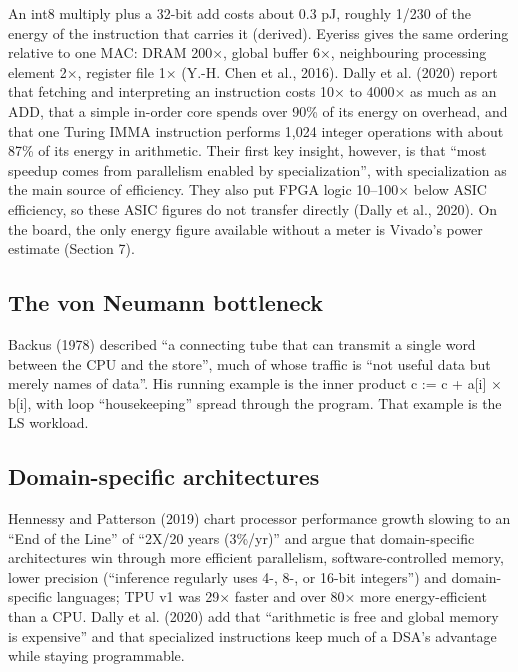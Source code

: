 An int8 multiply plus a 32-bit add costs about 0.3 pJ, roughly 1/230 of the energy of the instruction that carries it (derived). Eyeriss gives the same ordering relative to one MAC: DRAM 200×, global buffer 6×, neighbouring processing element 2×, register file 1× (Y.-H. Chen et al., 2016). Dally et al. (2020) report that fetching and interpreting an instruction costs 10× to 4000× as much as an ADD, that a simple in-order core spends over 90\% of its energy on overhead, and that one Turing IMMA instruction performs 1,024 integer operations with about 87\% of its energy in arithmetic. Their first key insight, however, is that “most speedup comes from parallelism enabled by specialization”, with specialization as the main source of efficiency. They also put FPGA logic 10–100× below ASIC efficiency, so these ASIC figures do not transfer directly (Dally et al., 2020). On the board, the only energy figure available without a meter is Vivado's power estimate (Section 7).

\subsection{The von Neumann bottleneck}

Backus (1978) described “a connecting tube that can transmit a single word between the CPU and the store”, much of whose traffic is “not useful data but merely names of data”. His running example is the inner product c := c + a{[}i{]} × b{[}i{]}, with loop “housekeeping” spread through the program. That example is the LS workload.

\subsection{Domain-specific architectures}

Hennessy and Patterson (2019) chart processor performance growth slowing to an “End of the Line” of “2X/20 years (3\%/yr)” and argue that domain-specific architectures win through more efficient parallelism, software-controlled memory, lower precision (“inference regularly uses 4-, 8-, or 16-bit integers”) and domain-specific languages; TPU v1 was 29× faster and over 80× more energy-efficient than a CPU. Dally et al. (2020) add that “arithmetic is free and global memory is expensive” and that specialized instructions keep much of a DSA's advantage while staying programmable.

